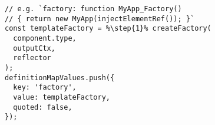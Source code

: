 \begin{verbatim}
// e.g. `factory: function MyApp_Factory()
// { return new MyApp(injectElementRef()); }`
const templateFactory = %\step{1}% createFactory(
  component.type,
  outputCtx,
  reflector
);
definitionMapValues.push({
  key: 'factory',
  value: templateFactory,
  quoted: false,
});
\end{verbatim}
